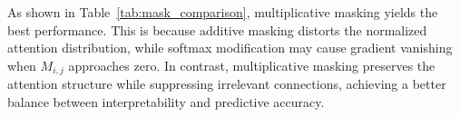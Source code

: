 \documentclass[sigconf, nonacm]{acmart}
\newcommand{\rlend}[1]{{\color{black}#1}}
\newcommand{\syadd}[1]{{\color{black}#1}}
\begin{document}

\syadd{As shown in Table~\ref{tab:mask_comparison}, multiplicative masking yields the best performance.} \rlend{This is because additive masking distorts the normalized attention distribution, while softmax modification may cause gradient vanishing when $M_{i,j}$ approaches zero. In contrast, multiplicative masking preserves the attention structure while suppressing irrelevant connections, achieving a better balance between interpretability and predictive accuracy.
}
\end{document}

